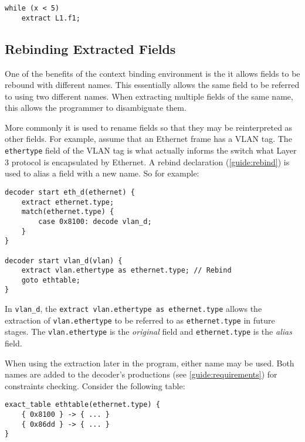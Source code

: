 \begin{minip}
\begin{lstlisting}
while (x < 5)
	extract L1.f1;
\end{lstlisting}
\end{minip}

\subsection{Rebinding Extracted Fields}

One of the benefits of the context binding environment is the it
allows fields to be rebound with different names. This essentially
allows the same field to be referred to using two different names.
When extracting multiple fields of the same name, this allows the
programmer to disambiguate them. 

More commonly it is used to rename fields so that they may be reinterpreted as other fields. For example, assume that an Ethernet
frame has a VLAN tag. The \texttt{ethertype} field of the VLAN tag is what 
actually informs the switch what Layer 3 protocol is encapsulated
by Ethernet. 
A rebind declaration (\ref{guide:rebind}) is used to alias a field with a new name.
So for example:

\begin{codepage}
\begin{lstlisting}
decoder start eth_d(ethernet) {
	extract ethernet.type;
	match(ethernet.type) {
		case 0x8100: decode vlan_d;
	}
}

decoder start vlan_d(vlan) {
	extract vlan.ethertype as ethernet.type; // Rebind
	goto ethtable;
}
\end{lstlisting}
\end{codepage}

In \texttt{vlan\_d}, the \texttt{extract vlan.ethertype as ethernet.type} allows the extraction of \texttt{vlan.ethertype} to be referred to as
\texttt{ethernet.type} in future stages. The \texttt{vlan.ethertype}
is the \emph{original} field and \texttt{ethernet.type} is the \emph{alias} field.

When using the extraction later in the program, either name may be used.  
Both names are added to the decoder's productions (see \ref{guide:requirements}) for constraints checking. 
Consider the following table:

\begin{codepage}
\begin{lstlisting}
exact_table ethtable(ethernet.type) {
	{ 0x8100 } -> { ... }
	{ 0x86dd } -> { ... }
}
\end{lstlisting}
\end{codepage}

